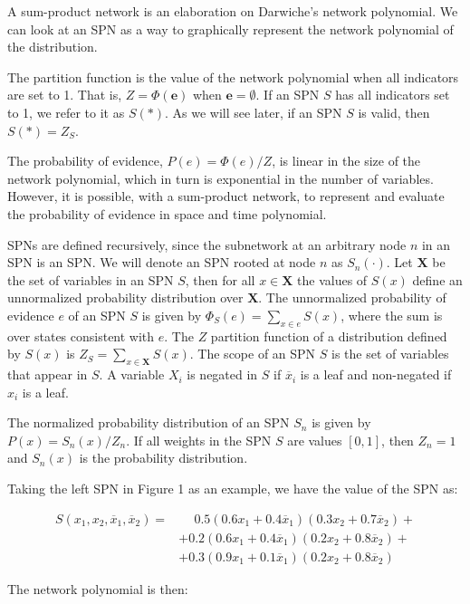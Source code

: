 \documentclass[a4paper,10pt]{article}
\theoremstyle{plain}
\begin{document}
A sum-product network is an elaboration on Darwiche's network polynomial. We can look at an SPN as
a way to graphically represent the network polynomial of the distribution.

The partition function is the value of the network polynomial when all indicators are set to 1.
That is, $Z=\Phi(\mathbf{e})$ when $\mathbf{e}=\emptyset$. If an SPN $S$ has all indicators set to
1, we refer to it as $S(*)$. As we will see later, if an SPN $S$ is valid, then $S(*)=Z_S$.

The probability of evidence, $P(e)=\Phi(e)/Z$, is linear in the size of the network polynomial,
which in turn is exponential in the number of variables. However, it is possible, with a
sum-product network, to represent and evaluate the probability of evidence in space and time
polynomial.

SPNs are defined recursively, since the subnetwork at an arbitrary node $n$ in an SPN is an SPN\@.
We will denote an SPN rooted at node $n$ as $S_n(\cdot)$. Let $\mathbf{X}$ be the set of variables
in an SPN $S$, then for all $x\in \mathbf{X}$ the values of $S(x)$ define an unnormalized
probability distribution over $\mathbf{X}$. The unnormalized probability of evidence $e$ of an SPN
$S$ is given by $\Phi_S(e)=\sum_{x\in e}S(x)$, where the sum is over states consistent with $e$.
The $Z$ partition function of a distribution defined by $S(x)$ is $Z_S=\sum_{x\in \mathbf{X}}S(x)$.
The scope of an SPN $S$ is the set of variables that appear in $S$. A variable $X_i$ is negated in
$S$ if $\overline{x}_i$ is a leaf and non-negated if $x_i$ is a leaf.

The normalized probability distribution of an SPN $S_n$ is given by $P(x)=S_n(x)/Z_n$. If all
weights in the SPN $S$ are values $[0,1]$, then $Z_n=1$ and $S_n(x)$ is the probability
distribution.

Taking the left SPN in Figure 1 as an example, we have the value of the SPN as:

\begin{align*}
  S(x_1,x_2,\overline{x}_1,\overline{x}_2)=&\phantom{{} +{}}0.5(0.6x_1+0.4\overline{x}_1)(0.3x_2+0.7\overline{x}_2)+\\
                                           &+0.2(0.6x_1+0.4\overline{x}_1)(0.2x_2+0.8\overline{x}_2)+\\
                                           &+0.3(0.9x_1+0.1\overline{x}_1)(0.2x_2+0.8\overline{x}_2)
\end{align*}

The network polynomial is then:
\end{document}
